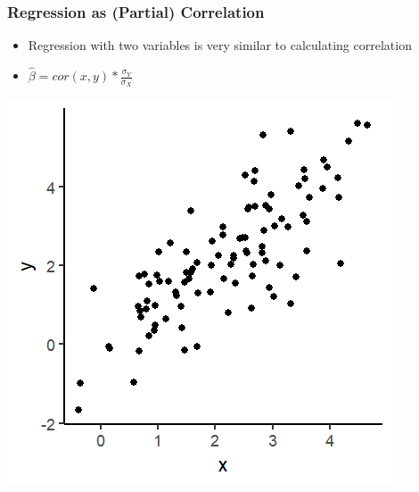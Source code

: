 \documentclass[xcolor=x11names,compress]{beamer}\usepackage[]{graphicx}\usepackage[]{color}
\makeatletter
\def\maxwidth{ %
  \ifdim\Gin@nat@width>\linewidth
    \linewidth
  \else
    \Gin@nat@width
  \fi
}
\newenvironment{knitrout}{}{} %
\renewcommand{\(}{\begin{columns}}
\renewcommand{\)}{\end{columns}}
\newcommand{\<}[1]{\begin{column}{#1}}
\renewcommand{\>}{\end{column}}
\makeatother
\begin{document}
\begin{frame}
\begin{multicols}{2}
\begin{knitrout}
\end{knitrout}
\end{multicols}
\end{frame}



\begin{frame}
\frametitle{Regression as (Partial) Correlation}
\begin{itemize}
\item Regression with two variables is very similar to calculating correlation
\pause
\item $\hat{\beta}=cor(x,y) * \frac{\sigma_Y}{\sigma_X}$
\pause
\end{itemize}
\begin{multicols}{2}
\begin{knitrout}
\color{fgcolor}
\includegraphics[width=\maxwidth]{figure/corr_regn_fig1-1} 

\end{knitrout}
\columnbreak
\end{multicols}
\end{frame}
\end{document}

